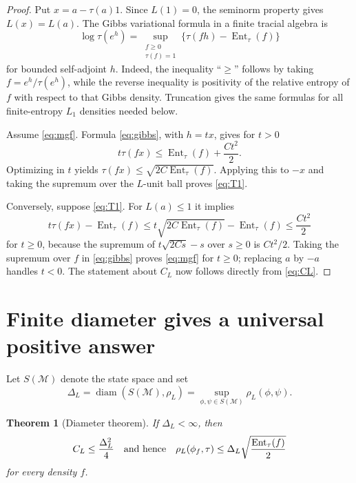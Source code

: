 \documentclass[11pt]{article}
\newtheorem{theorem}{Theorem}
\DeclareMathOperator{\Ent}{Ent}
\DeclareMathOperator{\diam}{diam}
\begin{document}
\begin{proof}
Put $x=a-\tau(a)1$.  Since $L(1)=0$, the seminorm property gives
$L(x)=L(a)$.  The Gibbs variational formula in a finite tracial algebra is
\begin{equation}\label{eq:gibbs}
 \log\tau(e^h)
 =\sup_{\substack{f\geq0\\\tau(f)=1}}
   \{\tau(fh)-\Ent_\tau(f)\}
\end{equation}
for bounded self-adjoint $h$.  Indeed, the inequality ``$\geq$'' follows by
taking $f=e^h/\tau(e^h)$, while the reverse inequality is positivity of the
relative entropy of $f$ with respect to that Gibbs density.  Truncation gives
the same formulas for all finite-entropy $L_1$ densities needed below.

Assume \eqref{eq:mgf}.  Formula \eqref{eq:gibbs}, with $h=tx$, gives for
$t>0$
\[
 t\tau(fx)\leq \Ent_\tau(f)+\frac{Ct^2}{2}.
\]
Optimizing in $t$ yields
$\tau(fx)\leq\sqrt{2C\Ent_\tau(f)}$.  Applying this to $-x$ and taking the
supremum over the $L$-unit ball proves \eqref{eq:T1}.

Conversely, suppose \eqref{eq:T1}.  For $L(a)\leq1$ it implies
\[
 t\tau(fx)-\Ent_\tau(f)
 \leq t\sqrt{2C\Ent_\tau(f)}-\Ent_\tau(f)
 \leq \frac{Ct^2}{2}
\]
for $t\geq0$, because the supremum of
$t\sqrt{2Cs}-s$ over $s\geq0$ is $Ct^2/2$.  Taking the supremum over $f$ in
\eqref{eq:gibbs} proves \eqref{eq:mgf} for $t\geq0$; replacing $a$ by $-a$
handles $t<0$.  The statement about $C_L$ now follows directly from
\eqref{eq:CL}.
\end{proof}

\section*{Finite diameter gives a universal positive answer}

Let $S(\mathcal M)$ denote the state space and set
\[
 \Delta_L=\diam(S(\mathcal M),\rho_L)
 =\sup_{\phi,\psi\in S(\mathcal M)}\rho_L(\phi,\psi).
\]

\begin{theorem}[Diameter theorem]\label{thm:diameter}
If $\Delta_L<\infty$, then
\[
 C_L\leq\frac{\Delta_L^2}{4}
 \quad\hbox{and hence}\quad
 \rho_L(\phi_f,\tau)
 \leq \Delta_L\sqrt{\frac{\Ent_\tau(f)}{2}}
\]
for every density $f$.
\end{theorem}
\end{document}
